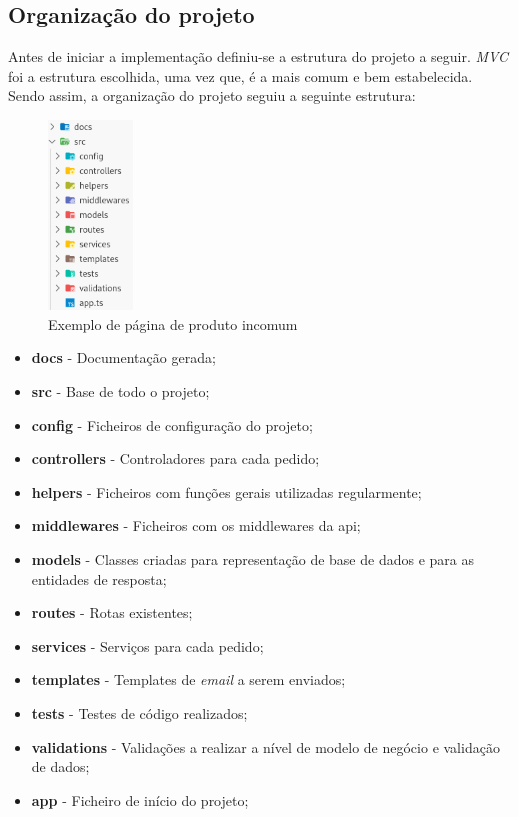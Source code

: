 \subsection{Organização do projeto}
Antes de iniciar a implementação definiu-se a estrutura do projeto a seguir. \textit{MVC} foi a estrutura escolhida, uma vez que, é a mais comum e bem estabelecida. Sendo assim, a organização do projeto seguiu a seguinte estrutura:
\begin{figure}[htb]
  \centering
  \includegraphics[width=0.2\textwidth]{images/implementacao/api/project_organization.png}
  \caption{Exemplo de página de produto incomum}
  \label{fig:63}
\end{figure}

\begin{itemize}
  \item \textbf{docs} - Documentação gerada;
  \item \textbf{src} - Base de todo o projeto;
  \item \textbf{config} - Ficheiros de configuração do projeto;
  \item \textbf{controllers} - Controladores para cada pedido;
  \item \textbf{helpers} - Ficheiros com funções gerais utilizadas regularmente;
  \item \textbf{middlewares} - Ficheiros com os middlewares da api;
  \item \textbf{models} - Classes criadas para representação de base de dados e para as entidades de resposta;
  \item \textbf{routes} - Rotas existentes;
  \item \textbf{services} - Serviços para cada pedido;
  \item \textbf{templates} - Templates de \textit{email} a serem enviados;
  \item \textbf{tests} - Testes de código realizados;
  \item \textbf{validations} - Validações a realizar a nível de modelo de negócio e validação de dados;
  \item \textbf{app} - Ficheiro de início do projeto;
\end{itemize}